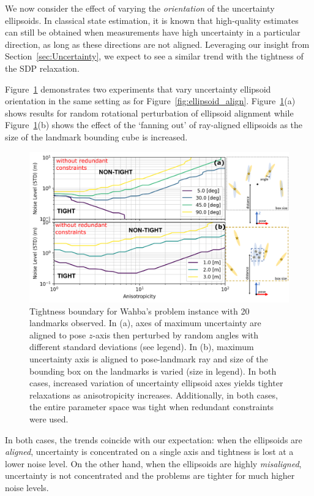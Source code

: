 \documentclass[lettersize,journal]{IEEEtran}
\begin{document}
We now consider the effect of varying the \emph{orientation} of the uncertainty ellipsoids. In classical state estimation, it is known that high-quality estimates can still be obtained when measurements have high uncertainty in a particular direction, as long as these directions are not aligned. Leveraging our insight from Section~\ref{sec:Uncertainty}, we expect to see a similar trend with the tightness of the SDP relaxation.
 
Figure~\ref{fig:wahba_axis_bnd} demonstrates two experiments that vary uncertainty ellipsoid orientation in the same setting as for Figure~\ref{fig:ellipsoid_align}. Figure~\ref{fig:wahba_axis_bnd}(a)  shows results for random rotational perturbation of ellipsoid alignment while Figure~\ref{fig:wahba_axis_bnd}(b)  shows the effect of the `fanning out' of ray-aligned ellipsoids as the size of the landmark bounding cube is increased. 
\begin{figure}[!b]
	\centering
	\includegraphics[width=\columnwidth]{figs/ellipsoid_study}
	\caption{Tightness boundary for Wahba's problem instance with 20 landmarks observed. In (a), axes of maximum uncertainty are aligned to pose $z$-axis then perturbed by random angles with different standard deviations (see legend). In (b), maximum uncertainty axis is aligned to pose-landmark ray and size of the bounding box on the landmarks is varied (size in legend). In both cases, increased variation of uncertainty ellipsoid axes yields tighter relaxations as anisotropicity increases. Additionally, in both cases, the entire parameter space was tight when redundant constraints were used.}
	\label{fig:wahba_axis_bnd}
\end{figure}


In both cases, the trends coincide with our expectation: when the ellipsoids are \textit{aligned}, uncertainty is concentrated on a single axis and tightness is lost at a lower noise level. On the other hand, when the ellipsoids are highly \textit{misaligned}, uncertainty is not concentrated and the problems are tighter for much higher noise levels. 
\end{document}
